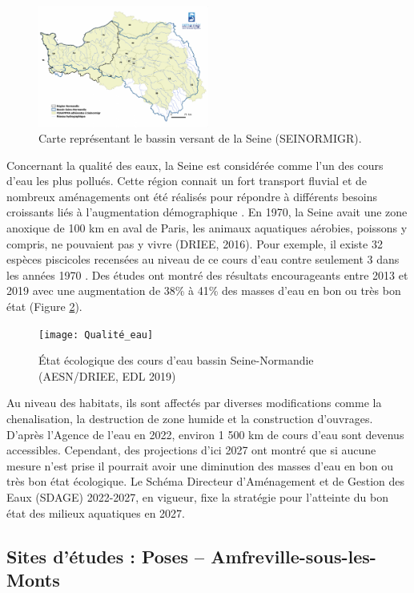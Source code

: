 \documentclass[11pt,titlepage,twoside]{article}\usepackage[]{graphicx}\usepackage[table]{xcolor}
\begin{document}
\begin{figure}[htpb]
\centering
\includegraphics[width=0.5\textwidth]{Bassin}
\caption{Carte représentant le bassin versant de la Seine (SEINORMIGR).}
\label{Bassin}
\end{figure}

Concernant la qualité des eaux, la Seine est considérée comme l’un des cours d’eau les plus pollués. Cette région connait un fort transport fluvial et de nombreux aménagements ont été réalisés pour répondre à différents besoins croissants liés à l’augmentation démographique \citep{thieu_nutrient_2009}. En 1970, la Seine avait une zone anoxique de 100 km en aval de Paris, les animaux aquatiques aérobies, poissons y compris, ne pouvaient pas y vivre (DRIEE, 2016). Pour exemple, il existe 32 espèces piscicoles recensées au niveau de ce cours d’eau contre seulement 3 dans les années 1970 \citep{rocher_evolution_2017}. Des études ont montré des résultats encourageants entre 2013 et 2019 avec une augmentation de 38\%  à 41\% des masses d'eau en bon ou très bon état (Figure \ref{Qualité_eau}).


\begin{figure}[htpb]
\centering
\texttt{[image: Qualité\_eau]}
\caption{État écologique des cours d’eau bassin Seine-Normandie (AESN/DRIEE, EDL 2019)}
\label{Qualité_eau}
\end{figure}

Au niveau des habitats, ils sont affectés par diverses modifications comme la chenalisation, la destruction de zone humide et la construction d’ouvrages. D’après l’Agence de l’eau en 2022, environ 1 500 km de cours d’eau sont devenus accessibles. Cependant, des projections d’ici 2027 ont montré que si aucune mesure n’est prise il pourrait avoir une diminution des masses d’eau en bon ou très bon état écologique. Le Schéma Directeur d'Aménagement et de Gestion des Eaux (SDAGE) 2022-2027, en vigueur, fixe la stratégie pour l'atteinte du bon état des milieux aquatiques en 2027.

\subsection{Sites d’études : Poses – Amfreville-sous-les-Monts}
\end{document}
